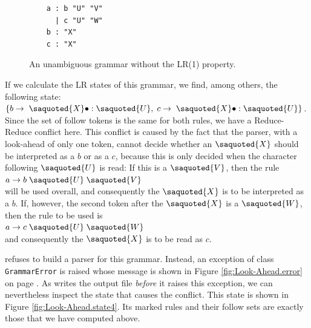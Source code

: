 \begin{figure}[!ht]
\centering
\begin{verbatim}
    a : b "U" "V"
      | c "U" "W"
    b : "X"
    c : "X"
\end{verbatim}
\vspace*{-0.3cm}
\caption{An unambiguous grammar without the LR(1) property.}
\label{fig:lr-conflict.g}
\end{figure}

If we calculate the LR states of this grammar,
we find, among others, the following state:
\\[0.2cm]
\hspace*{1.3cm}
$\{ b \rightarrow \;\saquoted{X} \bullet: \saquoted{U},\; c \rightarrow \;\saquoted{X} \bullet: \saquoted{U} \}$.
\\[0.2cm]
Since the set of follow tokens is the same for both rules, we have a Reduce-Reduce conflict here.
This conflict is caused by the fact that the parser, with a look-ahead of only one token, cannot
decide whether an $\saquoted{X}$ should be interpreted as a $b$ or as a $c$, because this
is only decided when the character following $\saquoted{U}$ is read: If this is
a $\saquoted{V}$, then the rule
\\[0.2cm]
\hspace*{1.3cm}
$a \rightarrow b\; \saquoted{U}\; \saquoted{V}$
\\[0.2cm]
will be used overall, and consequently the $\saquoted{X}$ is to be interpreted as a $b$. If, however, the second token
after the $\saquoted{X}$ is a $\saquoted{W}$, then the rule to be used is
\\[0.2cm]
\hspace*{1.3cm}
$a \rightarrow c \;\saquoted{U}\; \saquoted{W}$
\\[0.2cm]
and consequently the $\saquoted{X}$ is to be read as $c$.

 refuses to build a parser for this grammar.  Instead, an exception of class
\texttt{GrammarError} is raised whose message is shown in Figure \ref{fig:Look-Ahead.error} on page
\pageref{fig:Look-Ahead.error}.  As  writes the output file \emph{before} it raises this
exception, we can nevertheless inspect the state that causes the conflict.  This state is shown in Figure
\ref{fig:Look-Ahead.state4}.  Its marked rules and their follow sets are exactly those that we have computed
above.


